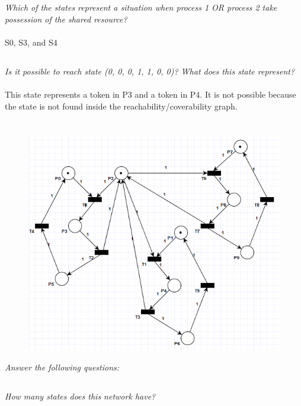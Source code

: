\documentclass[letterpaper]{article}
\begin{document}
\subsection{}
\textit{Which of the states represent a situation when process 1 OR process 2 take possession of the shared resource?}
\\
\\S0, S3, and S4

\subsection{}
\textit{Is it possible to reach state (0, 0, 0, 1, 1, 0, 0)? What does this state represent?}
\\
\\This state represents a token in P3 and a token in P4. It is not possible because the state is not found inside the reachability/coverability graph.

\section{}

\begin{figure}[H]
 \centering
 \includegraphics[width=\textwidth]{image4.png}
\end{figure}

\textit{Answer the following questions:}

\subsection{}
\textit{How many states does this network have?
}\\
\end{document}
